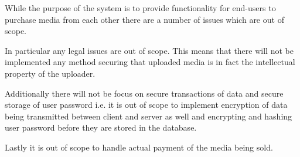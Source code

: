 \documentclass[../report.tex]{subfiles}
\begin{document}
While the purpose of the system is to provide functionality for end-users to purchase media from each other there are a number of issues which are out of scope. 

In particular any legal issues are out of scope. This means that there will not be implemented any method securing that uploaded media is in fact the intellectual property of the uploader. 

Additionally there will not be focus on secure transactions of data and secure storage of user password i.e. it is out of scope to implement encryption of data being transmitted between client and server as well and encrypting and hashing user password before they are stored in the database. 

Lastly it is out of scope to handle actual payment of the media being sold.
\end{document}
